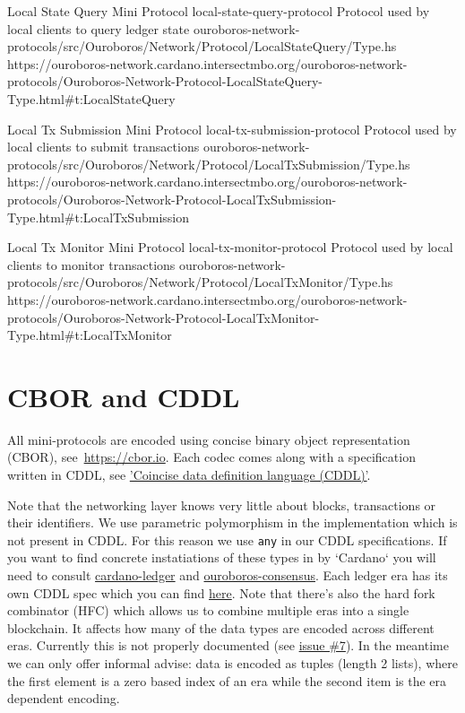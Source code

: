 \miniEntry
    {Local State Query Mini Protocol}
    {local-state-query-protocol}
    {Protocol used by local clients to query ledger state}
    {ouroboros-network-protocols/src/Ouroboros/Network/Protocol/LocalStateQuery/Type.hs}
    {https://ouroboros-network.cardano.intersectmbo.org/ouroboros-network-protocols/Ouroboros-Network-Protocol-LocalStateQuery-Type.html\#t:LocalStateQuery}

\miniEntry
    {Local Tx Submission Mini Protocol}
    {local-tx-submission-protocol}
    {Protocol used by local clients to submit transactions}
    {ouroboros-network-protocols/src/Ouroboros/Network/Protocol/LocalTxSubmission/Type.hs}
    {https://ouroboros-network.cardano.intersectmbo.org/ouroboros-network-protocols/Ouroboros-Network-Protocol-LocalTxSubmission-Type.html\#t:LocalTxSubmission}

\miniEntry
    {Local Tx Monitor Mini Protocol}
    {local-tx-monitor-protocol}
    {Protocol used by local clients to monitor transactions}
    {ouroboros-network-protocols/src/Ouroboros/Network/Protocol/LocalTxMonitor/Type.hs}
    {https://ouroboros-network.cardano.intersectmbo.org/ouroboros-network-protocols/Ouroboros-Network-Protocol-LocalTxMonitor-Type.html\#t:LocalTxMonitor}


\section{CBOR and CDDL}
All mini-protocols are encoded using concise binary object representation
(CBOR), see~\url{https://cbor.io}.  Each codec comes along with a specification
written in CDDL,
see \href{https://cbor-wg.github.io/cddl/draft-ietf-cbor-cddl.html}{'Coincise
data definition language (CDDL)'}.

Note that the networking layer knows very little about blocks, transactions or
their identifiers.  We use parametric polymorphism in the implementation which
is not present in CDDL.  For this reason we use \texttt{any} in our CDDL specifications.
If you want to find concrete instatiations of these types in by `Cardano` you
will need to consult
\href{https://github.com/intersectmbo/cardano-ledger}{cardano-ledger} and
\href{https://github.com/intersectmbo/ouroboros-consensus}{ouroboros-consensus}.
Each ledger era has its own CDDL spec which you can find
\href{https://github.com/intersectmbo/cardano-ledger#cardano-ledger}{here}.
Note that there's also the hard fork combinator (HFC) which allows us to
combine multiple eras into a single blockchain.  It affects how many of the
data types are encoded across different eras.  Currently this is not properly
documented (see
\href{https://github.com/intersectmbo/ouroboros-consensus/issues/7}{issue
\#7}). In the meantime we can only offer informal advise: data is encoded
as tuples (length 2 lists), where the first element is a zero based index of an
era while the second item is the era dependent encoding.

